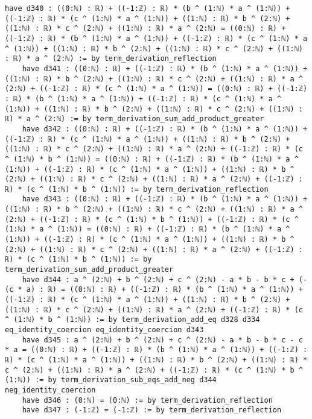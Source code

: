 \documentclass{article}
\begin{document}
\begin{tcolorbox}[colback=white!10, width=\linewidth]
\begin{lstlisting}[language=Lean4]
    have d340 : ((0:ℕ) : ℝ) + ((-1:ℤ) : ℝ) * (b ^ (1:ℕ) * a ^ (1:ℕ)) + ((-1:ℤ) : ℝ) * (c ^ (1:ℕ) * a ^ (1:ℕ)) + ((1:ℕ) : ℝ) * b ^ (2:ℕ) + ((1:ℕ) : ℝ) * c ^ (2:ℕ) + ((1:ℕ) : ℝ) * a ^ (2:ℕ) = ((0:ℕ) : ℝ) + ((-1:ℤ) : ℝ) * (b ^ (1:ℕ) * a ^ (1:ℕ)) + ((-1:ℤ) : ℝ) * (c ^ (1:ℕ) * a ^ (1:ℕ)) + ((1:ℕ) : ℝ) * b ^ (2:ℕ) + ((1:ℕ) : ℝ) * c ^ (2:ℕ) + ((1:ℕ) : ℝ) * a ^ (2:ℕ) := by term_derivation_reflection
    have d341 : ((0:ℕ) : ℝ) + ((-1:ℤ) : ℝ) * (b ^ (1:ℕ) * a ^ (1:ℕ)) + ((1:ℕ) : ℝ) * b ^ (2:ℕ) + ((1:ℕ) : ℝ) * c ^ (2:ℕ) + ((1:ℕ) : ℝ) * a ^ (2:ℕ) + ((-1:ℤ) : ℝ) * (c ^ (1:ℕ) * a ^ (1:ℕ)) = ((0:ℕ) : ℝ) + ((-1:ℤ) : ℝ) * (b ^ (1:ℕ) * a ^ (1:ℕ)) + ((-1:ℤ) : ℝ) * (c ^ (1:ℕ) * a ^ (1:ℕ)) + ((1:ℕ) : ℝ) * b ^ (2:ℕ) + ((1:ℕ) : ℝ) * c ^ (2:ℕ) + ((1:ℕ) : ℝ) * a ^ (2:ℕ) := by term_derivation_sum_add_product_greater
    have d342 : ((0:ℕ) : ℝ) + ((-1:ℤ) : ℝ) * (b ^ (1:ℕ) * a ^ (1:ℕ)) + ((-1:ℤ) : ℝ) * (c ^ (1:ℕ) * a ^ (1:ℕ)) + ((1:ℕ) : ℝ) * b ^ (2:ℕ) + ((1:ℕ) : ℝ) * c ^ (2:ℕ) + ((1:ℕ) : ℝ) * a ^ (2:ℕ) + ((-1:ℤ) : ℝ) * (c ^ (1:ℕ) * b ^ (1:ℕ)) = ((0:ℕ) : ℝ) + ((-1:ℤ) : ℝ) * (b ^ (1:ℕ) * a ^ (1:ℕ)) + ((-1:ℤ) : ℝ) * (c ^ (1:ℕ) * a ^ (1:ℕ)) + ((1:ℕ) : ℝ) * b ^ (2:ℕ) + ((1:ℕ) : ℝ) * c ^ (2:ℕ) + ((1:ℕ) : ℝ) * a ^ (2:ℕ) + ((-1:ℤ) : ℝ) * (c ^ (1:ℕ) * b ^ (1:ℕ)) := by term_derivation_reflection
    have d343 : ((0:ℕ) : ℝ) + ((-1:ℤ) : ℝ) * (b ^ (1:ℕ) * a ^ (1:ℕ)) + ((1:ℕ) : ℝ) * b ^ (2:ℕ) + ((1:ℕ) : ℝ) * c ^ (2:ℕ) + ((1:ℕ) : ℝ) * a ^ (2:ℕ) + ((-1:ℤ) : ℝ) * (c ^ (1:ℕ) * b ^ (1:ℕ)) + ((-1:ℤ) : ℝ) * (c ^ (1:ℕ) * a ^ (1:ℕ)) = ((0:ℕ) : ℝ) + ((-1:ℤ) : ℝ) * (b ^ (1:ℕ) * a ^ (1:ℕ)) + ((-1:ℤ) : ℝ) * (c ^ (1:ℕ) * a ^ (1:ℕ)) + ((1:ℕ) : ℝ) * b ^ (2:ℕ) + ((1:ℕ) : ℝ) * c ^ (2:ℕ) + ((1:ℕ) : ℝ) * a ^ (2:ℕ) + ((-1:ℤ) : ℝ) * (c ^ (1:ℕ) * b ^ (1:ℕ)) := by term_derivation_sum_add_product_greater
    have d344 : a ^ (2:ℕ) + b ^ (2:ℕ) + c ^ (2:ℕ) - a * b - b * c + (-(c * a) : ℝ) = ((0:ℕ) : ℝ) + ((-1:ℤ) : ℝ) * (b ^ (1:ℕ) * a ^ (1:ℕ)) + ((-1:ℤ) : ℝ) * (c ^ (1:ℕ) * a ^ (1:ℕ)) + ((1:ℕ) : ℝ) * b ^ (2:ℕ) + ((1:ℕ) : ℝ) * c ^ (2:ℕ) + ((1:ℕ) : ℝ) * a ^ (2:ℕ) + ((-1:ℤ) : ℝ) * (c ^ (1:ℕ) * b ^ (1:ℕ)) := by term_derivation_add_eq d328 d334 eq_identity_coercion eq_identity_coercion d343
    have d345 : a ^ (2:ℕ) + b ^ (2:ℕ) + c ^ (2:ℕ) - a * b - b * c - c * a = ((0:ℕ) : ℝ) + ((-1:ℤ) : ℝ) * (b ^ (1:ℕ) * a ^ (1:ℕ)) + ((-1:ℤ) : ℝ) * (c ^ (1:ℕ) * a ^ (1:ℕ)) + ((1:ℕ) : ℝ) * b ^ (2:ℕ) + ((1:ℕ) : ℝ) * c ^ (2:ℕ) + ((1:ℕ) : ℝ) * a ^ (2:ℕ) + ((-1:ℤ) : ℝ) * (c ^ (1:ℕ) * b ^ (1:ℕ)) := by term_derivation_sub_eqs_add_neg d344 neg_identity_coercion
    have d346 : (0:ℕ) = (0:ℕ) := by term_derivation_reflection
    have d347 : (-1:ℤ) = (-1:ℤ) := by term_derivation_reflection

\end{lstlisting}
\end{tcolorbox}
\end{document}
